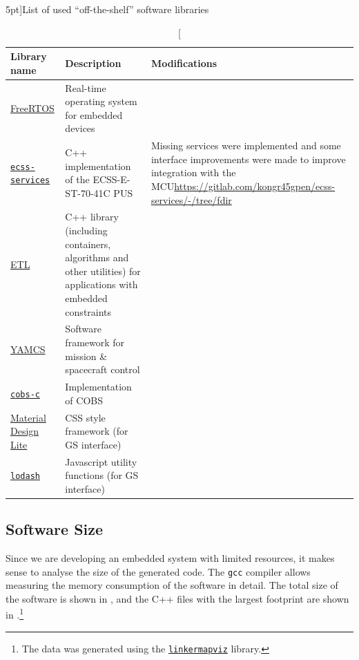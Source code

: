 \documentclass[a4paper,nobib]{tufte-book}
\begin{document}
\begin{table}[h]
	\centering
	\vspace{2em}
	\caption[][5pt]{List of used ``off-the-shelf'' software libraries}
	\renewcommand{\arraystretch}{1.5}
	\label{tab:old_software}
	\begin{tabularx}{\textwidth}{@{}lp{6cm}X@{}}
		\toprule
		Library name & Description & Modifications \\ \midrule
		\href{https://www.freertos.org/}{FreeRTOS} & Real-time operating system for embedded devices & \\
		\href{https://gitlab.com/acubesat/obc/ecss-services}{\texttt{ecss-services}} & C++ implementation of the ECSS-E-ST-70-41C \acl{PUS} %
		& \small Missing services were implemented and some interface improvements were made to improve integration with the \acs{MCU}\newline\small\url{https://gitlab.com/kongr45gpen/ecss-services/-/tree/fdir}
		 \\
		 \href{https://www.etlcpp.com/}{\acs{ETL}}  & C++ library (including containers, algorithms and other utilities) for applications with embedded constraints &
		 \\
 		\href{https://github.com/yamcs/yamcs}{\acs{YAMCS}}  & Software framework for mission \& spacecraft control & %
 		\\
		\href{https://github.com/cmcqueen/cobs-c}{\texttt{cobs-c}}  & Implementation of \ac{COBS} %
		 & \\
		 \href{https://getmdl.io/}{Material Design Lite} & CSS style framework (for \acs{GS} interface) & \\
		 \href{https://lodash.com/}{\texttt{lodash}} & Javascript utility functions (for \acs{GS} interface) & \\
		\bottomrule
	\end{tabularx}
\end{table}


\FloatBarrier
\subsection{Software Size}

Since we are developing an embedded system with limited resources, it makes sense to analyse the size of the generated code. The \texttt{gcc} compiler allows measuring the memory consumption of the software in detail. The total size of the software is shown in , and the C++ files with the largest footprint are shown in .\footnote{The data was generated using the \href{https://github.com/PromyLOPh/linkermapviz}{\texttt{linkermapviz}} library.}
\end{document}
